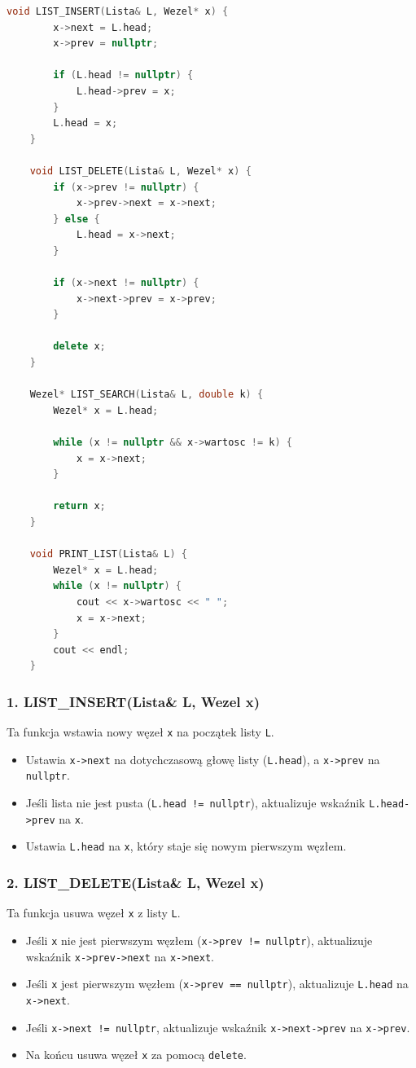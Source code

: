 \documentclass{article}
\begin{document}
			\begin{lstlisting}[language=C++, tabsize=3] 
	void LIST_INSERT(Lista& L, Wezel* x) {
		x->next = L.head;
		x->prev = nullptr; 
		
		if (L.head != nullptr) {
			L.head->prev = x;
		}
		L.head = x;
	}
	
	void LIST_DELETE(Lista& L, Wezel* x) {
		if (x->prev != nullptr) {
			x->prev->next = x->next;
		} else {
			L.head = x->next; 
		}
		
		if (x->next != nullptr) {
			x->next->prev = x->prev;
		}
		
		delete x; 
	}
	
	Wezel* LIST_SEARCH(Lista& L, double k) {
		Wezel* x = L.head;
		
		while (x != nullptr && x->wartosc != k) {
			x = x->next;
		}
		
		return x; 
	}
	
	void PRINT_LIST(Lista& L) {
		Wezel* x = L.head;
		while (x != nullptr) {
			cout << x->wartosc << " ";
			x = x->next;
		}
		cout << endl;
	}
			\end{lstlisting}
			
			\subsubsection*{1. LIST\_INSERT(Lista\& L, Wezel\* x)}
			
			Ta funkcja wstawia nowy węzeł \texttt{x} na początek listy \texttt{L}.
			\begin{itemize}
				\item Ustawia \texttt{x->next} na dotychczasową głowę listy (\texttt{L.head}), a \texttt{x->prev} na \texttt{nullptr}.
				\item Jeśli lista nie jest pusta (\texttt{L.head != nullptr}), aktualizuje wskaźnik \texttt{L.head->prev} na \texttt{x}.
				\item Ustawia \texttt{L.head} na \texttt{x}, który staje się nowym pierwszym węzłem.
			\end{itemize}
			
			\subsubsection*{2. LIST\_DELETE(Lista\& L, Wezel\* x)}
			
			Ta funkcja usuwa węzeł \texttt{x} z listy \texttt{L}.
			\begin{itemize}
				\item Jeśli \texttt{x} nie jest pierwszym węzłem (\texttt{x->prev != nullptr}), aktualizuje wskaźnik \texttt{x->prev->next} na \texttt{x->next}.
				\item Jeśli \texttt{x} jest pierwszym węzłem (\texttt{x->prev == nullptr}), aktualizuje \texttt{L.head} na \texttt{x->next}.
				\item Jeśli \texttt{x->next != nullptr}, aktualizuje wskaźnik \texttt{x->next->prev} na \texttt{x->prev}.
				\item Na końcu usuwa węzeł \texttt{x} za pomocą \texttt{delete}.
			\end{itemize}
			
\end{document}
